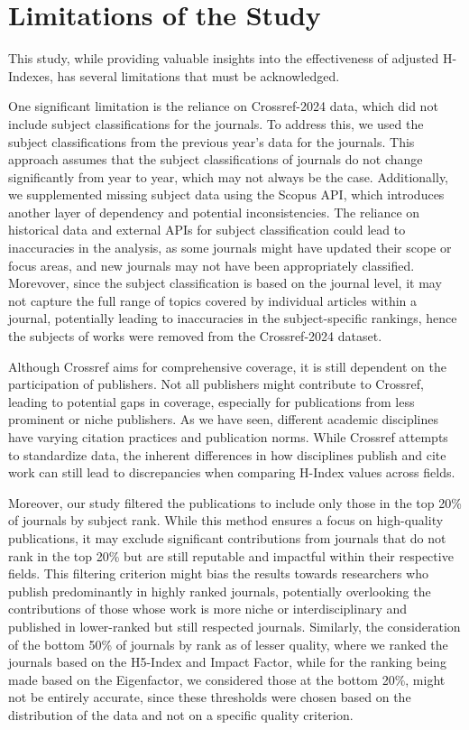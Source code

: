 \section{Limitations of the Study}

This study, while providing valuable insights into the effectiveness of
adjusted H-Indexes, has several limitations that must be acknowledged.

One significant limitation is the reliance on Crossref-2024 data, which did not
include subject classifications for the journals. To address this, we used the
subject classifications from the previous year’s data for the journals. This
approach assumes that the subject classifications of journals do not change
significantly from year to year, which may not always be the case.
Additionally, we supplemented missing subject data using the Scopus API, which
introduces another layer of dependency and potential inconsistencies. The
reliance on historical data and external APIs for subject classification could
lead to inaccuracies in the analysis, as some journals might have updated their
scope or focus areas, and new journals may not have been appropriately
classified. Morevover, since the subject classification is based on the journal
level, it may not capture the full range of topics covered by individual
articles within a journal, potentially leading to inaccuracies in the
subject-specific rankings, hence the subjects of works were removed from the
Crossref-2024 dataset.

Although Crossref aims for comprehensive coverage, it is still dependent on the
participation of publishers. Not all publishers might contribute to Crossref,
leading to potential gaps in coverage, especially for publications from less
prominent or niche publishers. As we have seen, different academic disciplines
have varying citation practices and publication norms. While Crossref attempts
to standardize data, the inherent differences in how disciplines publish and
cite work can still lead to discrepancies when comparing H-Index values across
fields.

Moreover, our study filtered the publications to include only those in the top
20\% of journals by subject rank. While this method ensures a focus on
high-quality publications, it may exclude significant contributions from
journals that do not rank in the top 20\% but are still reputable and impactful
within their respective fields. This filtering criterion might bias the results
towards researchers who publish predominantly in highly ranked journals,
potentially overlooking the contributions of those whose work is more niche or
interdisciplinary and published in lower-ranked but still respected journals.
Similarly, the consideration of the bottom 50\% of journals by rank as of
lesser quality, where we ranked the journals based on the H5-Index and Impact
Factor, while for the ranking being made based on the Eigenfactor, we
considered those at the bottom 20\%, might not be entirely accurate, since
these thresholds were chosen based on the distribution of the data and not on a
specific quality criterion. %

